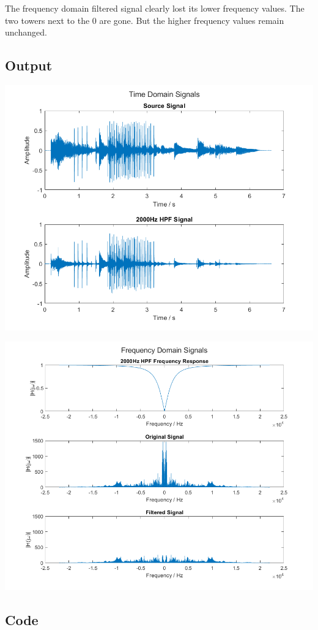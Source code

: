\documentclass[11pt]{article}
\begin{document}
The frequency domain filtered signal clearly lost its
lower frequency values. The two towers next to the 0 are gone.
But the higher frequency values remain unchanged.

\subsection{Output}

\includegraphics[height=0.5\textheight]{hpf_time.png}

\includegraphics[height=0.5\textheight]{hpf_frequency.png}

\subsection{Code}
\end{document}
